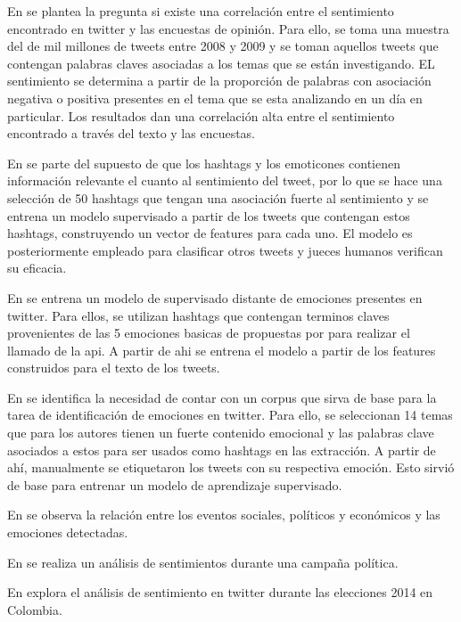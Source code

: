 En \cite{o2010tweets} se plantea la pregunta si existe una correlación entre el sentimiento encontrado en twitter y las encuestas de opinión. Para ello, se toma una muestra del de mil millones de tweets entre 2008 y 2009 y se toman aquellos tweets que contengan palabras claves asociadas a los temas que se están investigando. EL sentimiento se determina a partir de la proporción de palabras con asociación negativa o positiva presentes en el tema que se esta analizando en un día en particular. Los resultados dan una correlación alta entre el sentimiento encontrado a través del texto y las encuestas.

En \cite{davidov2010enhanced} se parte del supuesto de que los hashtags y los emoticones contienen información relevante el cuanto al sentimiento del tweet, por lo que se hace una selección de 50 hashtags que tengan una asociación fuerte al sentimiento y se entrena un modelo supervisado a partir de los tweets que contengan estos hashtags, construyendo un vector de features para cada uno. El modelo es posteriormente empleado para clasificar otros tweets y jueces humanos verifican su eficacia.


En  \cite{wang2012harnessing} se entrena un modelo de supervisado distante de emociones presentes en twitter. Para ellos, se utilizan hashtags que contengan terminos claves provenientes de las 5 emociones basicas de propuestas por \cite{ekman1993facial} para realizar el llamado de la api. A partir de ahi se entrena el modelo a partir de los features construidos para el texto de los tweets. 

En \cite{roberts2012empatweet} se identifica la necesidad de contar con un corpus que sirva de base para la tarea de identificación de emociones en twitter. Para ello, se seleccionan  14 temas que para los autores tienen un fuerte contenido emocional y las palabras clave asociados a estos para ser usados como hashtags en las extracción. A partir de ahí, manualmente se etiquetaron los tweets con su respectiva emoción. Esto sirvió de base para entrenar un modelo de aprendizaje supervisado.



En \cite{bollen2011modeling} se observa la relación entre los eventos sociales, políticos y económicos y las emociones detectadas.

En \cite{tumasjan2010predicting} se realiza un análisis de sentimientos durante una campaña política.

En \cite{ceron2016sentiment} explora el análisis de sentimiento en twitter durante las elecciones 2014 en Colombia.

